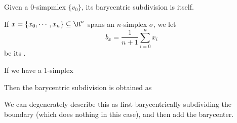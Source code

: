 \documentclass[a4paper]{article}
\begin{document}
\begin{defi}
  Given a $0$-simpmlex $\{v_0\}$, its barycentric subdivision is itself.

  If $x = \{x_0, \cdots, x_n\} \subseteq \R^n$ spans an $n$-simplex $\sigma$, we let
  \[
    b_x = \frac{1}{n + 1} \sum_{i = 0}^n x_i
  \]
  be its .

  If we have a $1$-simplex
  \begin{center}
  \end{center}
  Then the barycentric subdivision is obtained as
  \begin{center}
  \end{center}
  We can degenerately describe this as first barycentrically subdividing the boundary (which does nothing in this case), and then add the barycenter.


\end{defi}
\end{document}
